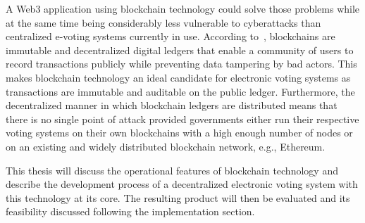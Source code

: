A \Gls{Web3} application using blockchain technology could solve those problems while at the same time being considerably less vulnerable to cyberattacks than centralized e-voting systems currently in use.
According to~\textcite{yaga_blockchain_2018}, blockchains are immutable and decentralized digital ledgers that enable a community of users to record transactions publicly while preventing data tampering by bad actors.
This makes blockchain technology an ideal candidate for electronic voting systems as transactions are immutable and auditable on the public ledger.
Furthermore, the decentralized manner in which blockchain ledgers are distributed means that there is no single point of attack provided governments either run their respective voting systems on their own blockchains
with a high enough number of nodes or on an existing and widely distributed blockchain network, e.g., Ethereum.

This thesis will discuss the operational features of blockchain technology and describe the development process of a decentralized electronic voting system with this technology at its core.
The resulting product will then be evaluated and its feasibility discussed following the implementation section.



